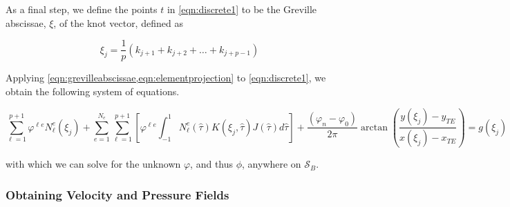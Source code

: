 	As a final step, we define the points $t$ in \cref{eqn:discrete1} to be the Greville abscissae, \(\xi\), of the knot vector, defined as
	
	\begin{equation}
	\label{eqn:grevilleabscissae}
	\xi_j = \frac{1}{p}\left(k_{j+1} + k_{j+2} + \dots + k_{j+p-1} \right)
	\end{equation}
	
	\noindent Applying \cref{eqn:grevilleabscissae,eqn:elementprojection} to \cref{eqn:discrete1}, we obtain the following system of equations.
	
	\begin{equation}
	\sum_{\ell=1}^{p+1}\varphi^{\ell e} N_{\ell}^{e}(\xi_j) +  \sum_{e=1}^{N_e} \sum_{\ell=1}^{p+1} \left[ \varphi^{\ell e} \int_{-1}^{1} N_{\ell}^{e}(\hat{\tau}) K(\xi_j,\hat{\tau}) J(\hat{\tau}) d\hat{\tau} \right] + \frac{\left(\varphi_n - \varphi_0 \right)}{2\pi} \arctan\left( \frac{y(\xi_j) - y_{TE}}{x(\xi_j)-x_{TE}} \right) = g(\xi_j)
	\end{equation}
	
	\noindent with which we can solve for the unknown $\varphi$, and thus $\phi$, anywhere on $\mathcal{S}_B$.
	
	
	\subsubsection{Obtaining Velocity and Pressure Fields}
	
